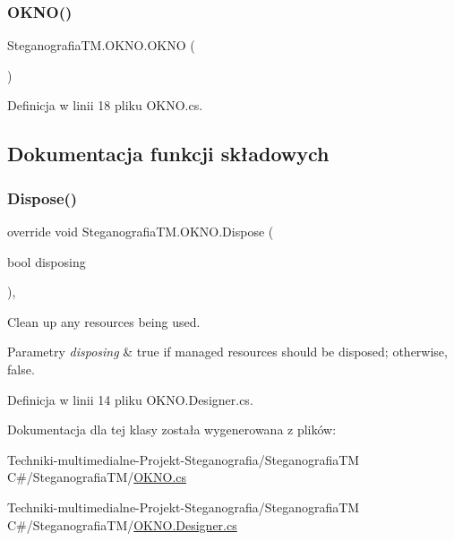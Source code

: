 \subsubsection{\texorpdfstring{O\+K\+N\+O()}{OKNO()}}
{\footnotesize\ttfamily Steganografia\+T\+M.\+O\+K\+N\+O.\+O\+K\+NO (\begin{DoxyParamCaption}{ }\end{DoxyParamCaption})\hspace{0.3cm}{\ttfamily [inline]}}



Definicja w linii 18 pliku O\+K\+N\+O.\+cs.



\subsection{Dokumentacja funkcji składowych}
\mbox{\label{class_steganografia_t_m_1_1_o_k_n_o_aab165c92013c9cd58f51cf2ae5be4531}} 
\subsubsection{\texorpdfstring{Dispose()}{Dispose()}}
{\footnotesize\ttfamily override void Steganografia\+T\+M.\+O\+K\+N\+O.\+Dispose (\begin{DoxyParamCaption}\item[{bool}]{disposing }\end{DoxyParamCaption})\hspace{0.3cm}{\ttfamily [inline]}, {\ttfamily [protected]}}



Clean up any resources being used. 


\begin{DoxyParams}{Parametry}
{\em disposing} & true if managed resources should be disposed; otherwise, false.\\
\hline
\end{DoxyParams}


Definicja w linii 14 pliku O\+K\+N\+O.\+Designer.\+cs.



Dokumentacja dla tej klasy została wygenerowana z plików\+:\begin{DoxyCompactItemize}
\item 
Techniki-\/multimedialne-\/\+Projekt-\/\+Steganografia/\+Steganografia\+T\+M C\#/\+Steganografia\+T\+M/\hyperlink{_o_k_n_o_8cs}{O\+K\+N\+O.\+cs}\item 
Techniki-\/multimedialne-\/\+Projekt-\/\+Steganografia/\+Steganografia\+T\+M C\#/\+Steganografia\+T\+M/\hyperlink{_o_k_n_o_8_designer_8cs}{O\+K\+N\+O.\+Designer.\+cs}\end{DoxyCompactItemize}

